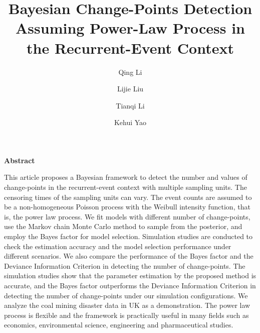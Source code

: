 \documentclass[12pt]{article}
\numberwithin{equation}{section}
\begin{document}
\makeatletter
\renewcommand{\maketitle}{\bgroup\setlength{\parindent}{0pt}
	\begin{flushleft}
		\textbf{\@title}\vspace{12pt}
		
		\@author
	\end{flushleft}\egroup
}
\makeatother
\title{Bayesian Change-Points Detection Assuming Power-Law Process in the Recurrent-Event Context}
\author[1]{Qing Li}
\author[2]{Lijie Liu}
\author[2]{Tianqi Li}
\author[2]{Kehui Yao}
\date{}
\maketitle
{}
\noindent \textbf{Abstract}

\noindent This article proposes a Bayesian framework to detect the number and values of change-points in the recurrent-event context with multiple sampling units. The censoring times of the sampling units can vary.  The event counts are assumed to be a non-homogeneous Poisson process with the Weibull intensity function, that is, the power law process. We fit models with different number of change-points, use the Markov chain Monte Carlo method to sample from the posterior, and employ the Bayes factor for model selection. Simulation studies are conducted to check the estimation accuracy and the model selection performance under different scenarios. We also compare the performance of the Bayes factor and the Deviance Information Criterion in detecting the number of change-points. The simulation studies show that the parameter estimation by the proposed method is accurate, and the Bayes factor outperforms the Deviance Information Criterion in detecting the number of change-points under our simulation configurations. We analyze the coal mining disaster data in UK as a demonstration. The power law process is flexible and the framework is practically useful in many fields such as economics, environmental science, engineering and pharmaceutical studies.      
\end{document}
